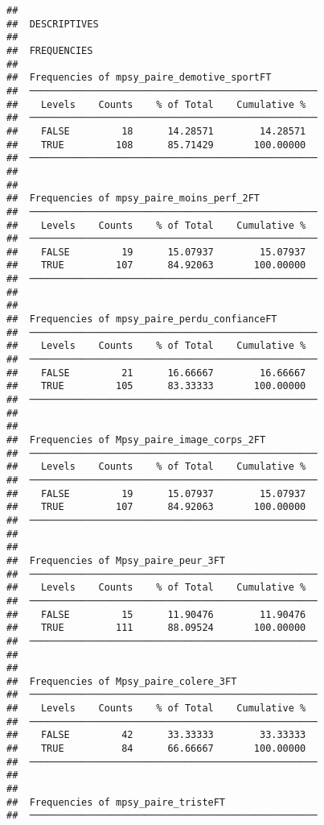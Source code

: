 \documentclass[
]{article}
\begin{document}
\begin{verbatim}
## 
##  DESCRIPTIVES
## 
##  FREQUENCIES
## 
##  Frequencies of mpsy_paire_demotive_sportFT         
##  ────────────────────────────────────────────────── 
##    Levels    Counts    % of Total    Cumulative %   
##  ────────────────────────────────────────────────── 
##    FALSE         18      14.28571        14.28571   
##    TRUE         108      85.71429       100.00000   
##  ────────────────────────────────────────────────── 
## 
## 
##  Frequencies of mpsy_paire_moins_perf_2FT           
##  ────────────────────────────────────────────────── 
##    Levels    Counts    % of Total    Cumulative %   
##  ────────────────────────────────────────────────── 
##    FALSE         19      15.07937        15.07937   
##    TRUE         107      84.92063       100.00000   
##  ────────────────────────────────────────────────── 
## 
## 
##  Frequencies of mpsy_paire_perdu_confianceFT        
##  ────────────────────────────────────────────────── 
##    Levels    Counts    % of Total    Cumulative %   
##  ────────────────────────────────────────────────── 
##    FALSE         21      16.66667        16.66667   
##    TRUE         105      83.33333       100.00000   
##  ────────────────────────────────────────────────── 
## 
## 
##  Frequencies of Mpsy_paire_image_corps_2FT          
##  ────────────────────────────────────────────────── 
##    Levels    Counts    % of Total    Cumulative %   
##  ────────────────────────────────────────────────── 
##    FALSE         19      15.07937        15.07937   
##    TRUE         107      84.92063       100.00000   
##  ────────────────────────────────────────────────── 
## 
## 
##  Frequencies of Mpsy_paire_peur_3FT                 
##  ────────────────────────────────────────────────── 
##    Levels    Counts    % of Total    Cumulative %   
##  ────────────────────────────────────────────────── 
##    FALSE         15      11.90476        11.90476   
##    TRUE         111      88.09524       100.00000   
##  ────────────────────────────────────────────────── 
## 
## 
##  Frequencies of Mpsy_paire_colere_3FT               
##  ────────────────────────────────────────────────── 
##    Levels    Counts    % of Total    Cumulative %   
##  ────────────────────────────────────────────────── 
##    FALSE         42      33.33333        33.33333   
##    TRUE          84      66.66667       100.00000   
##  ────────────────────────────────────────────────── 
## 
## 
##  Frequencies of mpsy_paire_tristeFT                 
##  ────────────────────────────────────────────────── 

\end{verbatim}
\end{document}
